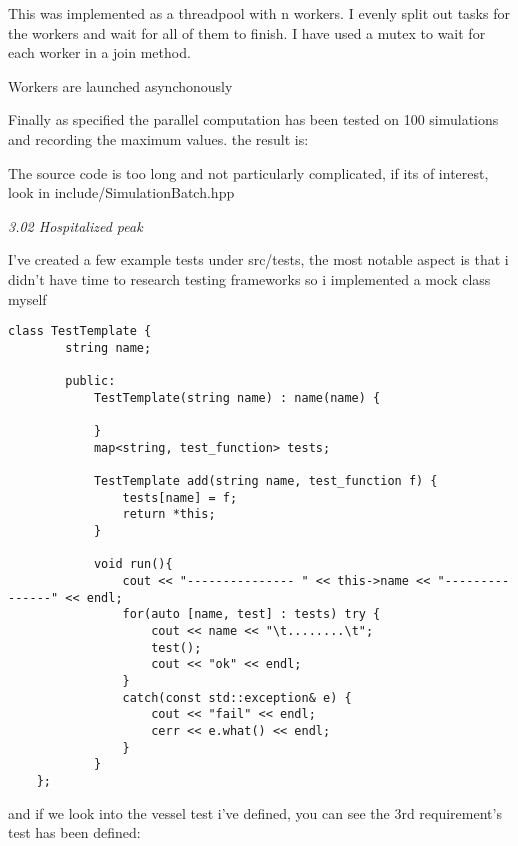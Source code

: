 This was implemented as a threadpool with n workers. I evenly split out tasks for the workers and wait for all of them to finish. I have used a mutex to wait for each worker in a join method. 

Workers are launched asynchonously

Finally as specified the parallel computation has been tested on 100 simulations and recording the maximum values. the result is:

The source code is too long and not particularly complicated, if its of interest, look in include/SimulationBatch.hpp

\emph{3.02 Hospitalized peak}


I've created a few example tests under src/tests, the most notable aspect is that i didn't have time to research testing frameworks so i implemented a mock class myself

\begin{lstlisting}[style=colorC++]
    class TestTemplate {
        string name;
    
        public:
            TestTemplate(string name) : name(name) {
    
            }
            map<string, test_function> tests;
    
            TestTemplate add(string name, test_function f) {
                tests[name] = f;
                return *this;
            }
    
            void run(){
                cout << "--------------- " << this->name << "---------------" << endl;
                for(auto [name, test] : tests) try {
                    cout << name << "\t........\t";
                    test();
                    cout << "ok" << endl;
                }
                catch(const std::exception& e) {
                    cout << "fail" << endl;
                    cerr << e.what() << endl;
                }
            }
    };
\end{lstlisting}

and if we look into the vessel test i've defined, you can see the 3rd requirement's test has been defined:

